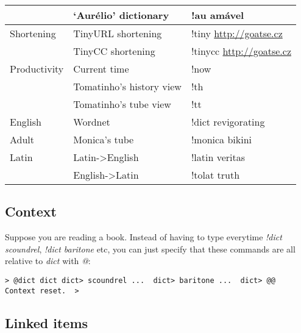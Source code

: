 \documentclass[11pt]{article}
\begin{document}
\begin{center}
\begin{tabular}{lll}
               &  `Aurélio' dictionary                   &  !au amável                                         \\
\hline
 Shortening    &  TinyURL shortening                     &  !tiny \href{http://goatse.cz}{http://goatse.cz}    \\
               &  TinyCC shortening                      &  !tinycc \href{http://goatse.cz}{http://goatse.cz}  \\
\hline
 Productivity  &  Current time                           &  !now                                               \\
               &  Tomatinho's history view               &  !th                                                \\
               &  Tomatinho's tube view                  &  !tt                                                \\
\hline
 English       &  Wordnet                                &  !dict revigorating                                 \\
\hline
 Adult         &  Monica's tube                          &  !monica bikini                                     \\
\hline
 Latin         &  Latin->English                         &  !latin veritas                                     \\
               &  English->Latin                         &  !tolat truth                                       \\
\end{tabular}
\end{center}



\subsection{Context}
\label{sec-2.2}


   Suppose you are reading a book. Instead of having to type everytime
   \emph{!dict scoundrel}, \emph{!dict baritone} etc, you can just specify that
   these commands are all relative to \emph{dict} with \emph{@}:


\begin{verbatim}
> @dict dict dict> scoundrel ...  dict> baritone ...  dict> @@
Context reset.  >
\end{verbatim}



\subsection{Linked items}
\label{sec-2.3}
\end{document}
